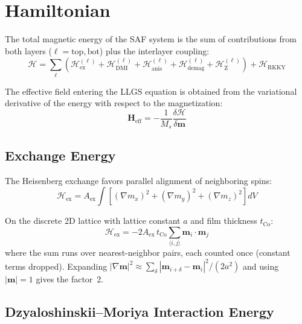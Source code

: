 \documentclass[11pt,a4paper]{article}
\newcommand{\mb}[1]{\mathbf{#1}}
\newcommand{\Heff}{\mb{H}_{\text{eff}}}
\newcommand{\tCo}{t_{\text{Co}}}
\newcommand{\Aex}{A_{\text{ex}}}
\newcommand{\Ms}{M_s}
\begin{document}
\section{Hamiltonian}

The total magnetic energy of the SAF system is the sum of
contributions from both layers
($\ell = \text{top}, \text{bot}$) plus the interlayer coupling:
%
\begin{equation}
\mathcal{H} = \sum_{\ell} \left(
    \mathcal{H}_{\text{ex}}^{(\ell)}
    + \mathcal{H}_{\text{DMI}}^{(\ell)}
    + \mathcal{H}_{\text{anis}}^{(\ell)}
    + \mathcal{H}_{\text{demag}}^{(\ell)}
    + \mathcal{H}_{\text{Z}}^{(\ell)}
\right)
+ \mathcal{H}_{\text{RKKY}}
\end{equation}

The effective field entering the LLGS equation is obtained from the
variational derivative of the energy with respect to the
magnetization:
%
\begin{equation}
\Heff = -\frac{1}{\Ms}
    \frac{\delta \mathcal{H}}{\delta \mb{m}}
\end{equation}

\subsection{Exchange Energy}

The Heisenberg exchange favors parallel alignment of neighboring
spins:
%
\begin{equation}
\mathcal{H}_{\text{ex}} = \Aex \int \left[
    (\nabla m_x)^2 + (\nabla m_y)^2 + (\nabla m_z)^2
\right] dV
\end{equation}

On the discrete 2D lattice with lattice constant $a$ and film
thickness $\tCo$:
%
\begin{equation}
\mathcal{H}_{\text{ex}} = -2\Aex \, \tCo
    \sum_{\langle i,j \rangle} \mb{m}_i \cdot \mb{m}_j
\end{equation}
%
where the sum runs over nearest-neighbor pairs, each counted once
(constant terms dropped).  Expanding
$|\nabla\mb{m}|^2 \approx \sum_\delta |\mb{m}_{i+\delta}
- \mb{m}_i|^2/(2a^2)$ and using $|\mb{m}|=1$ gives the factor~2.

\subsection{Dzyaloshinskii--Moriya Interaction Energy}
\end{document}
